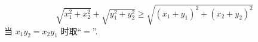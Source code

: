 
\begin{equation}
\sqrt{x_1^2 + x_2^2} + \sqrt{y_1^2 + y_2^2} \geqslant \sqrt{(x_1+y_1)^2 + (x_2+y_2)^2}
\end{equation}
当 $x_1 y_2 = x_2 y_1$ 时取“$=$”.
